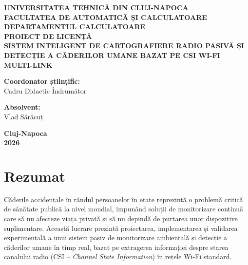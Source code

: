 \documentclass[12pt,a4paper,oneside]{report}
\begin{document}
\begin{titlepage}
\begin{center}
    {\large \textbf{UNIVERSITATEA TEHNICĂ DIN CLUJ-NAPOCA}}\\[0.2cm]
    {\large \textbf{FACULTATEA DE AUTOMATICĂ ȘI CALCULATOARE}}\\[0.2cm]
    {\large \textbf{DEPARTAMENTUL CALCULATOARE}}\\[2.5cm]

    {\Huge \textbf{PROIECT DE LICENȚĂ}}\\[1.8cm]

    {\LARGE \textbf{SISTEM INTELIGENT DE CARTOGRAFIERE RADIO PASIVĂ ȘI DETECȚIE A CĂDERILOR UMANE BAZAT PE CSI WI-FI MULTI-LINK}}\\[3.0cm]

    \begin{minipage}{0.48\textwidth}
        \large
        \textbf{Coordonator științific:}\\
        Cadru Didactic Îndrumător
    \end{minipage}
    \hfill
    \begin{minipage}{0.48\textwidth}
        \large
        \begin{flushright}
        \textbf{Absolvent:}\\
        Vlad Sărăcuț
        \end{flushright}
    \end{minipage}

    \vfill
    {\large \textbf{Cluj-Napoca}}\\
    {\large \textbf{2026}}
\end{center}
\end{titlepage}


\chapter*{Rezumat}
Căderile accidentale în rândul persoanelor în etate reprezintă o problemă critică de sănătate publică la nivel mondial, impunând soluții de monitorizare continuă care să nu afecteze viața privată și să nu depindă de purtarea unor dispozitive suplimentare. Această lucrare prezintă proiectarea, implementarea și validarea experimentală a unui sistem pasiv de monitorizare ambientală și detecție a căderilor umane în timp real, bazat pe extragerea informației despre starea canalului radio (CSI -- \textit{Channel State Information}) în rețele Wi-Fi standard.
\end{document}
